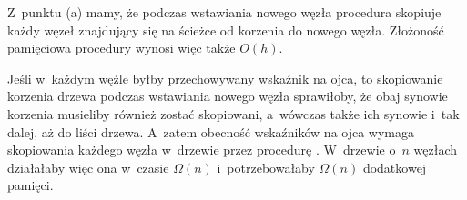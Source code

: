 Z~punktu (a) mamy, że podczas wstawiania nowego węzła procedura  skopiuje każdy węzeł znajdujący się na ścieżce od korzenia do nowego węzła.
Złożoność pamięciowa procedury wynosi więc także $O(h)$.

\subproblem %
Jeśli w~każdym węźle byłby przechowywany wskaźnik na ojca, to skopiowanie korzenia drzewa podczas wstawiania nowego węzła sprawiłoby, że obaj synowie korzenia musieliby również zostać skopiowani, a~wówczas także ich synowie i~tak dalej, aż do liści drzewa.
A~zatem obecność wskaźników na ojca wymaga skopiowania każdego węzła w~drzewie przez procedurę .
W~drzewie o~$n$ węzłach działałaby więc ona w~czasie $\Omega(n)$ i~potrzebowałaby $\Omega(n)$ dodatkowej pamięci.

\subproblem %
